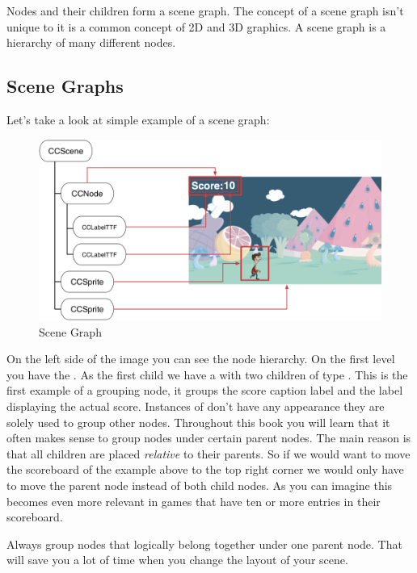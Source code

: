 Nodes and their children form a scene graph. The concept of a scene graph isn't
unique to \cocos{} it is a common concept of 2D and 3D graphics. A scene graph
is a hierarchy of many different nodes. 

\subsection{Scene Graphs}
Let's take a look at simple example of a scene graph:

\begin{figure}[H]
		\centering
		\includegraphics[width=0.9\linewidth]{images/cocos2d/SceneGraph.png}     
		\caption{\cocos{} Scene Graph}
\end{figure}

On the left side of the image you can see the node hierarchy. On the first level
you have the \ccscene{}. As the first child we have a \ccnode{} with two
children of type \cclabel{}. This \ccnode{} is the first example of a grouping
node, it groups the score caption label and the label displaying the actual
score. Instances of \ccnode{} don't have any appearance they are solely used to
group other nodes. Throughout this book you will learn that it often makes sense
to group nodes under certain parent nodes. The main reason is that all children are placed
\textit{relative} to their parents. So if we would want to move the scoreboard
of the example above to the top right corner we would only have to move the
parent node instead of both child nodes. As you can imagine this becomes
even more relevant in games that have ten or more entries in their scoreboard.

\begin{bestpractice}[frametitle={Structuring Nodes}] 
Always group nodes that logically belong together under one parent node. That
will save you a lot of time when you change the layout of your scene.
\end{bestpractice}

